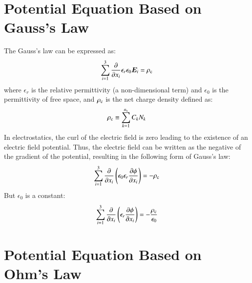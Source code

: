 \documentclass{warpdoc}
\newcommand{\ns}{{n_{\rm s}}}
\renewcommand{\vec}[1]{\bm{#1}}
\begin{document}
\section{Potential Equation Based on Gauss's Law}

The Gauss's law can be expressed as:
%
\begin{equation}
    \sum_{i=1}^3 \frac{\partial }{\partial x_i} \epsilon_r \epsilon_0 \vec{E}_i = \rho_{\rm c} 
\end{equation}
%
where $\epsilon_r$ is the relative permittivity (a non-dimensional term) and $\epsilon_0$ is the permittivity of free space, and $\rho_{\rm c}$ is the net charge density defined as:
%
\begin{equation}
\rho_{\rm c}\equiv
\sum_{k=1}^\ns C_k N_k
\end{equation}
%
In electrostatics, the curl of the electric field is zero leading to the existence of an electric field potential. Thus, the electric field can be written as the negative of the gradient of the potential, resulting in the following form of Gauss's law:
%
\begin{equation}
 \sum_{i=1}^3 \frac{\partial }{\partial x_i}\left(\epsilon_0 \epsilon_r \frac{\partial \phi}{\partial x_i} \right)=   -\rho_{\rm c} 
\end{equation}
%
But $\epsilon_0$ is a constant:
%
\begin{equation}
 \sum_{i=1}^3 \frac{\partial }{\partial x_i}\left( \epsilon_r \frac{\partial \phi}{\partial x_i} \right)=   -\frac{\rho_{\rm c}}{\epsilon_0} 
\end{equation}
%


\section{Potential Equation Based on Ohm's Law}
\end{document}

